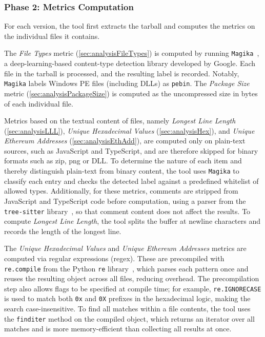 \subsubsection{Phase 2: Metrics Computation}
\label{subsubsec:ToolForAnalyzingPkgsPhase2}

For each version, the tool first extracts the tarball and computes the metrics on the individual files it contains. 

The \emph{File Types} metric (\cref{sec:analysisFileTypes}) is computed by running \texttt{Magika}~\cite{magika}, 
a deep-learning-based content-type detection library developed by Google. 
Each file in the tarball is processed, and the resulting label is recorded.
Notably, \texttt{Magika} labels Windows \ac{PE} files (including \acp{DLL}) as \texttt{pebin}.
The \emph{Package Size} metric (\cref{sec:analysisPackageSize}) is computed as the uncompressed size in bytes of each individual file.

Metrics based on the textual content of files, namely \emph{Longest Line Length} (\cref{sec:analysisLLL}), 
\emph{Unique Hexadecimal Values} (\cref{sec:analysisHex}), 
and \emph{Unique Ethereum Addresses} (\cref{sec:analysisEthAdd}),
are computed only on plain-text sources, such as JavaScript and TypeScript, 
and are therefore skipped for binary formats such as zip, png or \ac{DLL}.
To determine the nature of each item and thereby distinguish plain-text from binary content, 
the tool uses \texttt{Magika} to classify each entry and checks the detected label against a predefined whitelist of allowed types.
Additionally, for these metrics, 
comments are stripped from JavaScript and TypeScript code before computation, 
using a parser from the \texttt{tree-sitter} library~\cite{treesitter}, so that comment content does not affect the results.
To compute \emph{Longest Line Length}, the tool splits the buffer at newline characters and records the length of the longest line.

The \emph{Unique Hexadecimal Values} and \emph{Unique Ethereum Addresses} metrics are computed via regular expressions (regex).
These are precompiled with \texttt{re.compile} from the Python \texttt{re} library~\cite{re}, 
which parses each pattern once and reuses the resulting object across all files, reducing overhead.
The precompilation step also allows flags to be specified at compile time; 
for example, \texttt{re.IGNORECASE} is used to match both \texttt{0x} and \texttt{0X} prefixes in the hexadecimal logic, 
making the search case-insensitive.
To find all matches within a file contents, the tool uses the \texttt{finditer} method on the compiled object,
which returns an iterator over all matches and is more memory-efficient than collecting all results at once.

